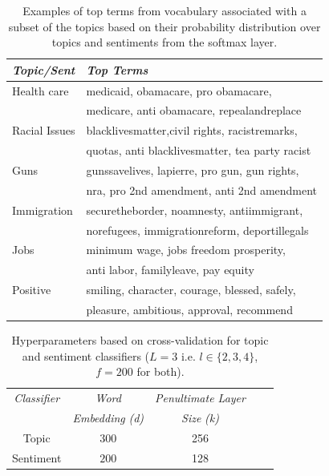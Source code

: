 \documentclass[letterpaper]{article}
\begin{document}
\begin{table}[h]
\centering
\small

\begin{tabular}{|l|l|}
\hline %
\emph{Topic/Sent} & \emph{Top Terms} \\ \hline
Health care & medicaid, obamacare, pro obamacare, \\ & medicare, anti obamacare, repealandreplace \\\hline
Racial Issues & blacklivesmatter,civil rights, racistremarks,\\&  quotas, anti blacklivesmatter, tea party racist \\\hline
Guns & gunssavelives, lapierre, pro gun, gun rights, \\ & nra, pro 2nd amendment, anti 2nd amendment \\\hline
Immigration & securetheborder, noamnesty, antiimmigrant, \\& norefugees, immigrationreform, deportillegals \\\hline
Jobs & minimum wage, jobs freedom prosperity, \\ & anti labor, familyleave, pay equity \\\hline
Positive & smiling, character, courage, blessed, safely,\\ & pleasure, ambitious, approval, recommend \\\hline


\end{tabular}
\caption{Examples of top terms from vocabulary associated with a subset of the topics based on their probability distribution over topics and sentiments from the softmax layer.}
\label{qe} %
\end{table}



\begin{table}[]%
\centering
\small
\begin{tabular}{ |c|c|c|c|c| }
\hline %
\emph{Classifier} & \emph{Word}    & \emph{Penultimate Layer} \\
&   \emph{Embedding} \emph{(d)} & \emph{Size} \emph{(k)} \\\hline %
Topic & $300$ &  256  \\\hline
Sentiment &$200$ &  128 \\\hline

\end{tabular}
\caption{Hyperparameters based on cross-validation for topic and sentiment classifiers ($L=3$ i.e. $l\in \{2,3,4\}$, $f=200$ for both). }
\label{topic_sent} %
\end{table}
\end{document}

